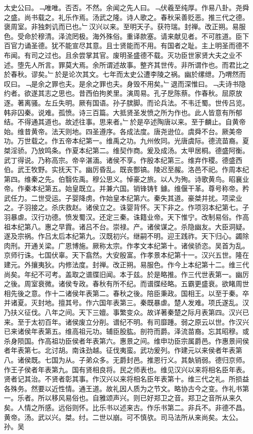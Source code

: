 \documentclass{zhvt-classic}
\begin{document}
\hspace*{2em}太史公曰。﹁唯唯。否否。不然。余闻之先人曰。﹁伏羲至纯厚。作易八卦。尧舜之盛。尚书载之。礼乐作焉。汤武之隆。诗人歌之。春秋采善贬恶。推三代之德。褒周室。非独刺讥而已也。﹂汉兴以来。至明天子。获符瑞。封禅。改正朔。易服色。受命於穆清。泽流罔极。海外殊俗。重译款塞。请来献见者。不可胜道。臣下百官力诵圣德。犹不能宣尽其意。且士贤能而不用。有国者之耻。主上明圣而德不布闻。有司之过也。且余尝掌其官。废明圣盛德不载。灭功臣世家贤大夫之业不述。堕先人所言。罪莫大焉。余所谓述故事。整齐其世传。非所谓作也。而君比之於春秋。谬矣。﹂於是论次其文。七年而太史公遭李陵之祸。幽於缧绁。乃喟然而叹曰。﹁是余之罪也夫。是余之罪也夫。身毁不用矣。﹂退而深惟曰。﹁夫诗书隐约者。欲遂其志之思也。昔西伯拘羑里。演周易。孔子戹陈蔡。作春秋。屈原放逐。著离骚。左丘失明。厥有国语。孙子膑脚。而论兵法。不韦迁蜀。世传吕览。韩非囚秦。说难。孤愤。诗三百篇。大抵贤圣发愤之所为作也。此人皆意有所郁结。不得通其道也。故述往事。思来者。﹂於是卒述陶唐以来。至于麟止。自黄帝始。维昔黄帝。法天则地。四圣遵序。各成法度。唐尧逊位。虞舜不台。厥美帝功。万世载之。作五帝本纪第一。维禹之功。九州攸同。光唐虞际。德流苗裔。夏桀淫骄。乃放鸣条。作夏本纪第二。维契作商。爰及成汤。太甲居桐。德盛阿衡。武丁得说。乃称高宗。帝辛湛湎。诸侯不享。作殷本纪第三。维弃作稷。德盛西伯。武王牧野。实抚天下。幽厉昏乱。既丧酆镐。陵迟至赧。洛邑不祀。作周本纪第四。维秦之先。伯翳佐禹。穆公思义。悼豪之旅。以人为殉。诗歌黄鸟。昭襄业帝。作秦本纪第五。始皇既立。并兼六国。销锋铸钅鐻。维偃干革。尊号称帝。矜武任力。二世受运。子婴降虏。作始皇本纪第六。秦失其道。豪桀并扰。项梁业之。子羽接之。杀庆救赵。诸侯立之。诛婴背怀。天下非之。作项羽本纪第七。子羽暴虐。汉行功德。愤发蜀汉。还定三秦。诛籍业帝。天下惟宁。改制易俗。作高祖本纪第八。惠之早霣。诸吕不台。崇禄。产。诸侯谋之。杀隐幽友。大臣洞疑。遂及宗祸。作吕太后本纪第九。汉既初兴。继嗣不明。迎王践祚。天下归心。蠲除肉刑。开通关梁。广恩博施。厥称太宗。作孝文本纪第十。诸侯骄恣。吴首为乱。京师行诛。七国伏辜。天下翕然。大安殷富。作孝景本纪第十一。汉兴五世。隆在建元。外攘夷狄。内修法度。封禅。改正朔。易服色。作今上本纪第十二。维三代尚矣。年纪不可考。盖取之谱牒旧闻。本于兹。於是略推。作三代世表第一。幽厉之後。周室衰微。诸侯专政。春秋有所不纪。而谱牒经略。五霸更盛衰。欲睹周世相先後之意。作十二诸侯年表第二。春秋之後。陪臣秉政。国相王。以至于秦。卒并诸夏。灭封地。擅其号。作六国年表第三。秦既暴虐。楚人发难。项氏遂乱。汉乃扶义征伐。八年之间。天下三嬗。事繁变众。故详著秦楚之际月表第四。汉兴已来。至于太初百年。诸侯废立分削。谱纪不明。有司靡踵。弱之原云以世。作汉兴已来诸侯年表第五。维高祖元功。辅臣股肱。剖符而爵。泽流苗裔。忘其昭穆。或杀身陨国。作高祖功臣侯者年表第六。惠景之间。维申功臣宗属爵邑。作惠景间侯者年表第七。北讨胡。南诛劲越。征伐夷蛮。武功爰列。作建元以来侯者年表第八。诸侯既。七国为从。子弟众多。无爵封邑。推恩行义。其埶销弱。德归京师。作王子侯者年表第九。国有贤相良将。民之师表也。维见汉兴以来将相名臣年表。贤者记其治。不贤者彰其事。作汉兴以来将相名臣年表第十。维三代之礼。所损益各殊务。然要以近性情。通王道。故礼因人质为之节文。略协古今之变。作礼书第一。乐者。所以移风易俗也。自雅颂声兴。则已好郑卫之音。郑卫之音所从来久矣。人情之所感。远俗则怀。比乐书以述来古。作乐书第二。非兵不。非德不昌。黄帝。汤。武以兴。桀。纣。二世以崩。可不慎欤。司马法所从来尚矣。太公。孙。吴
\end{document}
